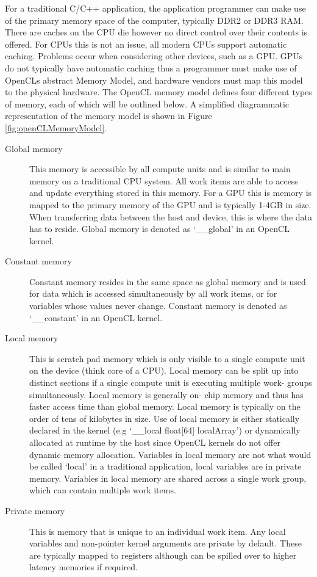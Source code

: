 For a traditional C/C++ application, the application programmer can make use of
the primary memory space of the computer, typically DDR2 or DDR3 RAM. There are
caches on the CPU die however no direct control over their contents is offered.
For CPUs this is not an issue, all modern CPUs support automatic caching.
Problems occur when considering other devices, such as a GPU. GPUs do not
typically have automatic caching thus a programmer must make use of OpenCLs
abstract Memory Model, and hardware vendors must map this model to the physical
hardware. The OpenCL memory model defines four different types of memory, each
of which will be outlined below. A simplified diagrammatic representation of the
memory model is shown in Figure \ref{fig:openCLMemoryModel}.

\begin{description}

\item[Global memory] This memory is accessible by all compute units and is
similar to main memory on a traditional CPU system. All work items are able to
access and update everything stored in this memory. For a GPU this is memory is
mapped to the primary memory of the GPU and is typically 1-4GB in size. When
transferring data between the host and device, this is where the data has to
reside. Global memory is denoted as `\_\_global' in an OpenCL kernel.

\item[Constant memory] Constant memory resides in the same space as global
memory and is used for data which is accessed simultaneously by all work items,
or for variables whose values never change. Constant memory is denoted as
`\_\_constant' in an OpenCL kernel.

\item[Local memory] This is scratch pad memory which is only visible to a single
compute unit on the device (think core of a CPU). Local memory can be split up
into distinct sections if a single compute unit is executing multiple work-
groups simultaneously. Local memory is generally on- chip memory and thus has
faster access time than global memory. Local memory is typically on the order of
tens of kilobytes in size. Use of local memory is either statically declared in
the kernel (e.g `\_\_local float[64] localArray') or dynamically allocated at
runtime by the host since OpenCL kernels do not offer dynamic memory allocation.
Variables in local memory are not what would be called `local' in a traditional
application, local variables are in private memory. Variables in local memory
are shared across a single work group, which can contain multiple work items.

\item[Private memory] This is memory that is unique to an individual work item.
Any local variables and non-pointer kernel arguments are private by default.
These are typically mapped to registers although can be spilled over to higher
latency memories if required.

\end{description}

